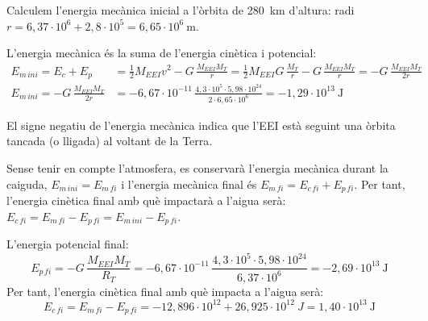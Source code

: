 \begin{solapartat}
 Calculem l'energia mecànica inicial a l'òrbita de 280~km d'altura: radi $r = 6,37\cdot 10^{6} + 2,8\cdot 10^{5} = 6,65\cdot 10^{6}\ \mathrm{m}$.

L'energia mecànica és la suma de l'energia cinètica i potencial:
\begin{align*}
E_{m\,ini} = E_c + E_p &= \frac{1}{2}M_{EEI}v^2 - G\,\frac{M_{EEI}M_T}{r} = \frac{1}{2}M_{EEI}G\,\frac{M_T}{r} - G\,\frac{M_{EEI}M_T}{r} = -G\,\frac{M_{EEI}M_T}{2r}\\
E_{m\,ini} = -G\,\frac{M_{EEI}M_T}{2r} &= -6,67\cdot 10^{-11}\,\frac{4,3\cdot 10^{5}\cdot 5,98\cdot 10^{24}}{2\cdot 6,65\cdot 10^{6}} = -1,29\cdot 10^{13}\ \mathrm{J}
\end{align*}

 El signe negatiu de l'energia mecànica indica que l'EEI està seguint una òrbita tancada (o lligada) al voltant de la Terra.

 Sense tenir en compte l'atmosfera, es conservarà l'energia mecànica durant la caiguda, $E_{m\,ini} = E_{m\,fi}$ i l'energia mecànica final és $E_{m\,fi} = E_{c\,fi} + E_{p\,fi}$. Per tant, l'energia cinètica final amb què impactarà a l'aigua serà: $E_{c\,fi} = E_{m\,fi} - E_{p\,fi} = E_{m\,ini} - E_{p\,fi}$.

L'energia potencial final:
\[ E_{p\,fi} = -G\,\frac{M_{EEI}M_T}{R_T} = -6,67\cdot 10^{-11}\,\frac{4,3\cdot 10^{5}\cdot 5,98\cdot 10^{24}}{6,37\cdot 10^{6}} = -2,69\cdot 10^{13}\ \mathrm{J} \]
Per tant, l'energia cinètica final amb què impacta a l'aigua serà:
\[ E_{c\,fi} = E_{m\,fi} - E_{p\,fi} = -12,896\cdot 10^{12} + 26,925\cdot 10^{12}\ J = 1,40\cdot 10^{13}\ \mathrm{J} \]
\end{solapartat}
